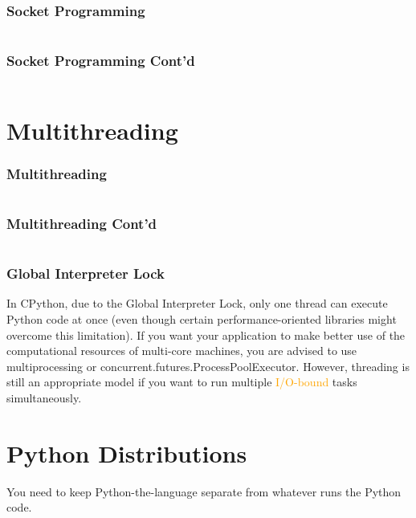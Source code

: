 \documentclass{../py-lecture}
\begin{document}
\begin{frame}[fragile]
	\frametitle{Socket Programming}
  \inputminted[bgcolor=Black,fontsize=\scriptsize]{python}{./src/server.py}
\end{frame}

\begin{frame}[fragile]
	\frametitle{Socket Programming Cont'd}
  \inputminted[bgcolor=Black,fontsize=\scriptsize]{python}{./src/client.py}
\end{frame}

\section{Multithreading}

\begin{frame}[fragile]
	\frametitle{Multithreading}
  \inputminted[bgcolor=Black,fontsize=\scriptsize,lastline=22]{python}{./src/thread.py}
\end{frame}

\begin{frame}[fragile]
	\frametitle{Multithreading Cont'd}
  \inputminted[bgcolor=Black,fontsize=\scriptsize,firstline=24]{python}{./src/thread.py}
\end{frame}

\begin{frame}
  \frametitle{Global Interpreter Lock}
  \begin{block}{}
    In CPython, due to the Global Interpreter Lock, only one thread can execute Python code at once (even though certain performance-oriented libraries might overcome this limitation).
    If you want your application to make better use of the computational resources of multi-core machines,
    you are advised to use multiprocessing or concurrent.futures.ProcessPoolExecutor. However, threading is still an appropriate model
    if you want to run multiple \textcolor{Orange}{I/O-bound} tasks simultaneously.
  \end{block}
\end{frame}

\section{Python Distributions}

\begin{frame}
  \begin{block}{}
    You need to keep Python-the-language separate from whatever runs the Python code.
  \end{block}
\end{frame}
\end{document}
